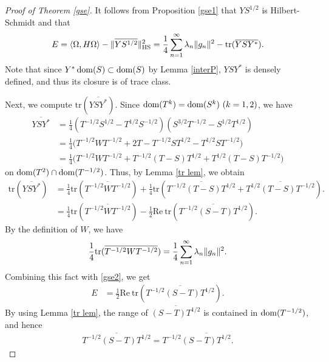 \documentclass[12pt]{article}
\theoremstyle{plain}
\numberwithin{equation}{section}
\theoremstyle{remark}
\begin{document}
\begin{proof}[Proof of Theorem \ref{gse}]
It follows from Proposition \ref{gse1} that $YS^{1/2}$ is Hilbert-Schmidt and that
\begin{equation}
  E = \left\langle\Omega,H\Omega\right\rangle - \|\overline{YS^{1/2}}\|_{\rm HS}^2
=\frac{1}{4} \sum_{n=1}^\infty \lambda_n \| g_n \|^2 - \mathrm{tr} (\overline{YSY^*}). \label{gse2}
\end{equation}
Note that since $Y^* \mathop{\mathrm{dom}}(S)\subset \mathop{\mathrm{dom}}(S)$ by Lemma \ref{interP}, $YSY^*$ is densely defined, and thus its closure is of trace class.

Next, we compute $\mathrm{tr}(\overline{YSY^*})$. 
Since $\mathop{\mathrm{dom}}(T^k)=\mathop{\mathrm{dom}}(S^k)\ (k=1,2)$, we have
\begin{align*}
  \overline{YSY^*}
 &= \frac{1}{4} (T^{-1/2}S^{1/2}-T^{1/2}S^{-1/2})(S^{3/2}T^{-1/2}-S^{1/2}T^{1/2}) \\
 &= \frac{1}{4} \big( T^{-1/2}WT^{-1/2} +2T-T^{-1/2}ST^{1/2}-T^{1/2}ST^{-1/2} \big)  \\
 &= \frac{1}{4} \big( T^{-1/2}WT^{-1/2} + T^{-1/2}(T-S)T^{1/2} +  T^{1/2}(T-S)T^{-1/2} \big)
\end{align*}
on $\mathop{\mathrm{dom}}(T^2)\cap \mathop{\mathrm{dom}}(T^{-1/2})$.
Thus, by Lemma \ref{tr lem}, we obtain
\begin{align*}
  \mathrm{tr}(\overline{YSY^*})
& = \frac{1}{4} \mathrm{tr}( \overline{T^{-1/2}WT^{-1/2}} )
    +\frac{1}{4} \mathrm{tr} ( \overline{T^{-1/2}(T-S)T^{1/2}} +  \overline{T^{1/2}(T-S)T^{-1/2}} ).\\
& = \frac{1}{4} \mathrm{tr}( \overline{T^{-1/2}WT^{-1/2}} ) - \frac{1}{2} \mathrm{Re} ~ \mathrm{tr} ( \overline{T^{-1/2}(S-T)T^{1/2}} ).
\end{align*}
By the definition of $W$, we have
\begin{align*}
  \frac{1}{4} \mathrm{tr}( \overline{T^{-1/2}WT^{-1/2}} )
 = \frac{1}{4} \sum_{n=1}^\infty \lambda_n\| g_n \|^2.
\end{align*}
Combining this fact with \eqref{gse2}, we get
\begin{align*}
  E &=  \frac{1}{2} \mathrm{Re} ~ \mathrm{tr} ( \overline{T^{-1/2}(S-T)T^{1/2}} ).
\end{align*}
By using Lemma \ref{tr lem}, the range of $\overline{(S-T)T^{1/2}}$ is contained in $\mathop{\mathrm{dom}}(T^{-1/2})$, and hence
\begin{align}
 \overline{T^{-1/2}(S-T)T^{1/2}} = T^{-1/2}\overline{(S-T)T^{1/2}}.   \label{tstt}

\end{align}
\end{proof}
\end{document}

